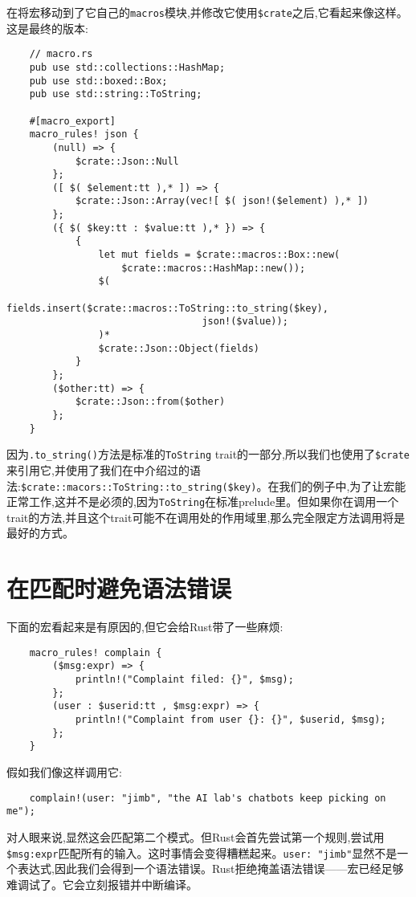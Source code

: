 在将宏移动到了它自己的\texttt{macros}模块,并修改它使用\texttt{\$crate}之后,它看起来像这样。这是最终的版本:
\begin{verbatim}
    // macro.rs
    pub use std::collections::HashMap;
    pub use std::boxed::Box;
    pub use std::string::ToString;

    #[macro_export]
    macro_rules! json {
        (null) => {
            $crate::Json::Null
        };
        ([ $( $element:tt ),* ]) => {
            $crate::Json::Array(vec![ $( json!($element) ),* ])
        };
        ({ $( $key:tt : $value:tt ),* }) => {
            {
                let mut fields = $crate::macros::Box::new(
                    $crate::macros::HashMap::new());
                $(
                    fields.insert($crate::macros::ToString::to_string($key), 
                                  json!($value));
                )*
                $crate::Json::Object(fields)
            }
        };
        ($other:tt) => {
            $crate::Json::from($other)
        };
    }
\end{verbatim}

因为\texttt{.to\_string()}方法是标准的\texttt{ToString} trait的一部分,所以我们也使用了\texttt{\$crate}来引用它,并使用了我们在中介绍过的语法:\texttt{\$crate::macors::ToString::to\_string(\$key)}。在我们的例子中,为了让宏能正常工作,这并不是必须的,因为\texttt{ToString}在标准prelude里。但如果你在调用一个trait的方法,并且这个trait可能不在调用处的作用域里,那么完全限定方法调用将是最好的方式。

\section{在匹配时避免语法错误}
下面的宏看起来是有原因的,但它会给Rust带了一些麻烦:
\begin{verbatim}
    macro_rules! complain {
        ($msg:expr) => {
            println!("Complaint filed: {}", $msg);
        };
        (user : $userid:tt , $msg:expr) => {
            println!("Complaint from user {}: {}", $userid, $msg);
        };
    }
\end{verbatim}

假如我们像这样调用它:
\begin{verbatim}
    complain!(user: "jimb", "the AI lab's chatbots keep picking on me");
\end{verbatim}

对人眼来说,显然这会匹配第二个模式。但Rust会首先尝试第一个规则,尝试用\texttt{\$msg:expr}匹配所有的输入。这时事情会变得糟糕起来。\texttt{user: "jimb"}显然不是一个表达式,因此我们会得到一个语法错误。Rust拒绝掩盖语法错误——宏已经足够难调试了。它会立刻报错并中断编译。

